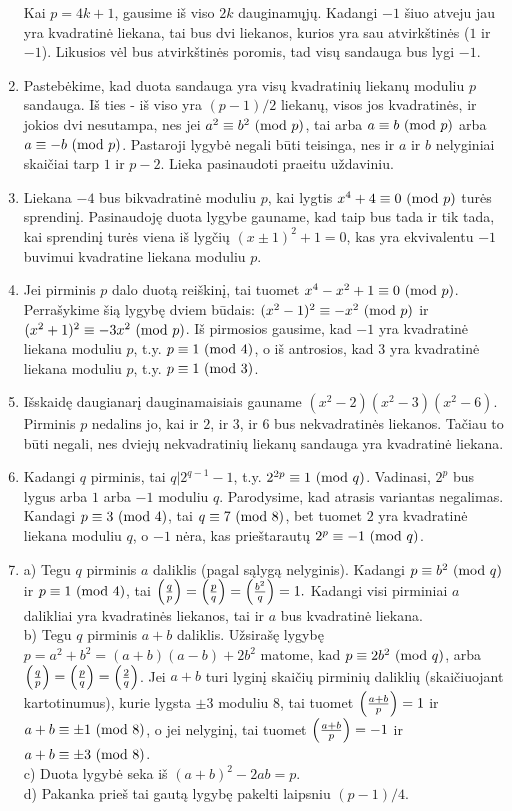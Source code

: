 \begin{enumerate}
    Kai $p=4k+1$, gausime iš viso $2k$ dauginamųjų. Kadangi $-1$ šiuo
    atveju jau yra kvadratinė liekana, tai bus dvi liekanos, kurios yra
    sau atvirkštinės ($1$ ir $-1$). Likusios vėl bus atvirkštinės poromis,
    tad visų sandauga bus lygi $-1$.
\item
    Pastebėkime, kad duota sandauga yra visų kvadratinių liekanų moduliu
    $p$ sandauga. Iš ties - iš viso yra $(p-1)/2$ liekanų, visos jos
    kvadratinės, ir jokios dvi nesutampa, nes jei $a^2 \equiv b^2 \ (\text{mod } p)$,
    tai arba $a\equiv b\ (\text{mod } p)$ arba $a\equiv -b\ (\text{mod } p)$. Pastaroji lygybė
    negali būti teisinga, nes ir $a$ ir $b$ nelyginiai skaičiai tarp $1$
    ir $p-2$. Lieka pasinaudoti praeitu uždaviniu.
\item
    Liekana $-4$ bus bikvadratinė moduliu $p$, kai lygtis $x^4 + 4 \equiv
    0 \ (\text{mod } p)$ turės sprendinį. Pasinaudoję duota lygybe gauname, kad taip
    bus tada ir tik tada, kai sprendinį turės viena iš lygčių $(x\pm1)^2 +
    1=0$, kas yra ekvivalentu $-1$ buvimui kvadratine liekana moduliu $p$. 
\item
    Jei pirminis $p$ dalo duotą reiškinį, tai tuomet $x^4 - x^2 + 1
    \equiv 0 \ (\text{mod } p)$. Perrašykime šią lygybę dviem būdais: $(x^2-1)^2\equiv
    -x^2\ (\text{mod } p)$ ir $(x^2+1)^2 \equiv -3x^2\ (\text{mod } p)$. Iš pirmosios gausime, kad
    $-1$ yra kvadratinė liekana moduliu $p$, t.y. $p \equiv 1\ (\text{mod } 4)$, o iš
    antrosios, kad $3$ yra kvadratinė liekana moduliu $p$, t.y. $p \equiv
    1\ (\text{mod } 3)$.
\item
    Išskaidę daugianarį dauginamaisiais gauname $(x^2 - 2)(x^2-3)(x^2-6).$
    Pirminis $p$ nedalins jo, kai ir $2$, ir $3$, ir $6$ bus nekvadratinės
    liekanos. Tačiau to būti negali, nes dviejų nekvadratinių liekanų
    sandauga yra kvadratinė liekana.
\item
    Kadangi $q$ pirminis, tai $q|2^{q-1}-1$, t.y. $2^{2p}\equiv 1\ (\text{mod } q)$.
    Vadinasi, $2^p$ bus lygus arba $1$ arba $-1$ moduliu $q$. Parodysime,
    kad atrasis variantas negalimas. Kandagi $p\equiv 3\ (\text{mod } 4)$, tai
    $q\equiv 7\ (\text{mod } 8)$, bet tuomet $2$ yra kvadratinė liekana moduliu
    $q$, o $-1$ nėra, kas prieštarautų $2^p\equiv -1 \ (\text{mod } q)$. 
\item
    a) Tegu $q$ pirminis $a$ daliklis (pagal sąlygą
    nelyginis). Kadangi $p \equiv b^2 \ (\text{mod } q)$ ir $p\equiv 1 \ (\text{mod } 4)$, tai
    $\left(\frac{q}{p}\right)=\left(\frac{p}{q}\right)=\left(\frac{b^2}{q}\right)=1.$ Kadangi visi pirminiai $a$
    dalikliai yra kvadratinės liekanos, tai ir $a$ bus kvadratinė
    liekana.\\
    b) Tegu $q$ pirminis $a+b$ daliklis. Užsirašę lygybę
    $p=a^2+b^2 = (a+b)(a-b) +2b^2$ matome, kad $p\equiv 2b^2\ (\text{mod } q)$, arba
    $\left(\frac{q}{p}\right)=\left(\frac{p}{q}\right)=\left(\frac{2}{q}\right)$. Jei $a+b$ turi lyginį skaičių
    pirminių daliklių (skaičiuojant kartotinumus), kurie lygsta $\pm 3$
    moduliu $8$, tai tuomet $\left(\frac{a+b}{p}\right)=1$ ir $a+b \equiv \pm 1
    \ (\text{mod } 8)$, o jei nelyginį, tai tuomet $\left(\frac{a+b}{p}\right)=-1$ ir $a+b\equiv \pm
    3\ (\text{mod } 8)$.\\
    c) Duota lygybė seka iš $(a+b)^2 -2ab = p$.\\
    d) Pakanka prieš tai gautą lygybę pakelti laipsniu $(p-1)/4$.
    

\end{enumerate}
